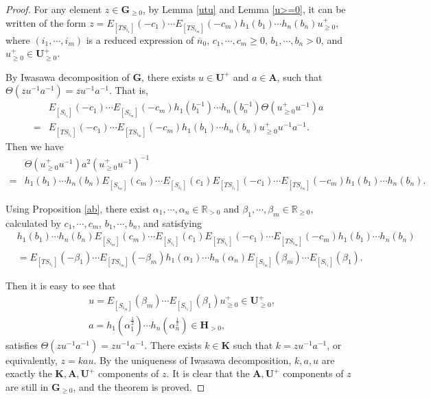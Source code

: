\documentclass[12pt]{amsart}
\begin{document}
\begin{proof}
    For any element $z\in \mathbf{G}_{\geq 0}$, by Lemma \ref{utu} and Lemma \ref{u>=0}, it can be written of the form $z=E_{[TS_{i_1}]}(-c_1)\cdots E_{[TS_{i_m}]}(-c_m)h_1(b_1)\cdots h_n(b_n)u_{\geq 0}^+$, where $(i_1,\cdots,i_m)$ is a reduced expression of $\overline{n}_0$, $c_1,\cdots,c_m\geq 0$, $b_1,\cdots,b_n>0$, and $u_{\geq 0}^+\in \mathbf{U}^+_{\geq 0}$.

    By Iwasawa decomposition of $\mathbf{G}$, there exists $u\in \mathbf{U}^+$ and $a\in \mathbf{A}$, such that $\Theta(zu^{-1}a^{-1})=zu^{-1}a^{-1}$.
    That is, 
    \begin{align*}
        &E_{[S_{i_1}]}(-c_1)\cdots E_{[S_{i_m}]}(-c_m)h_1(b_1^{-1})\cdots h_n(b_n^{-1}) \Theta(u_{\geq 0}^+u^{-1})a\\
        =& E_{[TS_{i_1}]}(-c_1)\cdots E_{[TS_{i_m}]}(-c_m)h_1(b_1)\cdots h_n(b_n)u_{\geq 0}^+ u^{-1}a^{-1}.
    \end{align*}
    Then we have 
    \begin{align*}
        &\Theta(u_{\geq 0}^+u^{-1})a^2 (u_{\geq 0}^+ u^{-1})^{-1}\\
        =& h_1(b_1)\cdots h_n(b_n) E_{[S_{i_m}]}(c_m) \cdots E_{[S_{i_1}]}(c_1)E_{[TS_{i_1}]}(-c_1)\cdots E_{[TS_{i_m}]}(-c_m) h_1(b_1)\cdots h_n(b_n).
    \end{align*}

    Using Proposition \ref{ab}, there exist $\alpha_1,\cdots,\alpha_n\in \mathbb{R}_{>0}$ and $\beta_1,\cdots,\beta_m \in \mathbb{R}_{\geq 0}$, calculated by $c_1,\cdots,c_m$, $b_1,\cdots,b_n$, and satisfying
\begin{align*}
    &h_1(b_1)\cdots h_n(b_n) E_{[S_{i_m}]}(c_m) \cdots E_{[S_{i_1}]}(c_1)E_{[TS_{i_1}]}(-c_1)\cdots E_{[TS_{i_m}]}(-c_m) h_1(b_1)\cdots h_n(b_n) \\
    &= E_{[TS_{i_1}]}(-\beta_1)\cdots E_{[TS_{i_m}]}(-\beta_m)h_1(\alpha_1)\cdots h_n(\alpha_n) E_{[S_{i_m}]}(\beta_m)\cdots E_{[S_{i_1}]}(\beta_1).
\end{align*}

Then it is easy to see that 
\begin{align*}
    & u=E_{[S_{i_m}]}(\beta_m)\cdots E_{[S_{i_1}]}(\beta_1)u_{\geq 0}^+ \in \mathbf{U}_{\geq 0}^+ ,\\
    & a=h_1(\alpha_1^{\frac{1}{2}})\cdots h_n(\alpha_n^{\frac{1}{2}}) \in \mathbf{H}_{>0},
\end{align*}
satisfies $\Theta(zu^{-1}a^{-1})=zu^{-1}a^{-1}$.
There exists $k\in \mathbf{K}$ such that $k=zu^{-1}a^{-1}$, or equivalently, $z=kau$.
By the uniqueness of Iwasawa decomposition, $k,a,u$ are exactly the $\mathbf{K},\mathbf{A},\mathbf{U}^+$ components of $z$.
It is clear that the $\mathbf{A},\mathbf{U}^+$ components of $z$ are still in $\mathbf{G}_{\geq 0}$, and the theorem is proved.
\end{proof}
\end{document}
